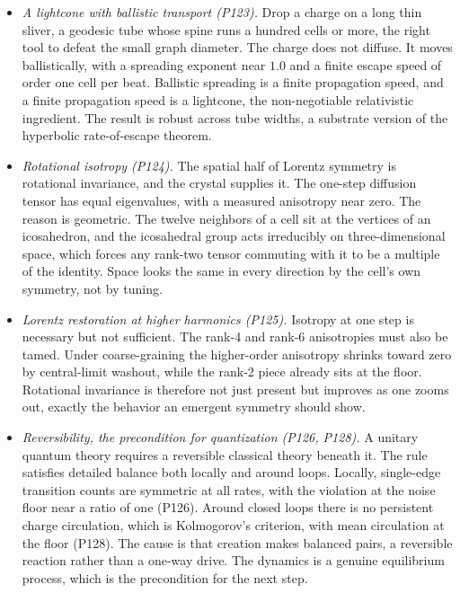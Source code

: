 \begin{itemize}
\item \emph{A lightcone with ballistic transport (P123).} Drop a charge on a long thin sliver, a geodesic tube whose spine runs a hundred cells or more, the right tool to defeat the small graph diameter. The charge does not diffuse. It moves ballistically, with a spreading exponent near $1.0$ and a finite escape speed of order one cell per beat. Ballistic spreading is a finite propagation speed, and a finite propagation speed is a lightcone, the non-negotiable relativistic ingredient. The result is robust across tube widths, a substrate version of the hyperbolic rate-of-escape theorem.

\item \emph{Rotational isotropy (P124).} The spatial half of Lorentz symmetry is rotational invariance, and the crystal supplies it. The one-step diffusion tensor has equal eigenvalues, with a measured anisotropy near zero. The reason is geometric. The twelve neighbors of a cell sit at the vertices of an icosahedron, and the icosahedral group acts irreducibly on three-dimensional space, which forces any rank-two tensor commuting with it to be a multiple of the identity. Space looks the same in every direction by the cell's own symmetry, not by tuning.

\item \emph{Lorentz restoration at higher harmonics (P125).} Isotropy at one step is necessary but not sufficient. The rank-4 and rank-6 anisotropies must also be tamed. Under coarse-graining the higher-order anisotropy shrinks toward zero by central-limit washout, while the rank-2 piece already sits at the floor. Rotational invariance is therefore not just present but improves as one zooms out, exactly the behavior an emergent symmetry should show.

\item \emph{Reversibility, the precondition for quantization (P126, P128).} A unitary quantum theory requires a reversible classical theory beneath it. The rule satisfies detailed balance both locally and around loops. Locally, single-edge transition counts are symmetric at all rates, with the violation at the noise floor near a ratio of one (P126). Around closed loops there is no persistent charge circulation, which is Kolmogorov's criterion, with mean circulation at the floor (P128). The cause is that creation makes balanced pairs, a reversible reaction rather than a one-way drive. The dynamics is a genuine equilibrium process, which is the precondition for the next step.


\end{itemize}
